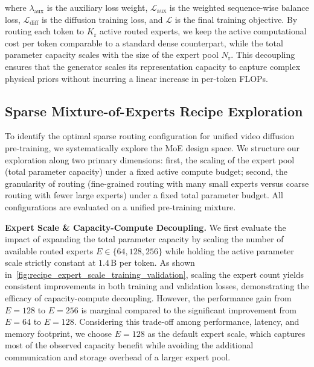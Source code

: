 where $\lambda_{\mathrm{aux}}$ is the auxiliary loss weight, $\mathcal{L}_{\mathrm{aux}}$ is the weighted sequence-wise balance loss, $\mathcal{L}_{\mathrm{diff}}$ is the diffusion training loss, and $\mathcal{L}$ is the final training objective. By routing each token to $K_{\mathrm{r}}$ active routed experts, we keep the active computational cost per token comparable to a standard dense counterpart, while the total parameter capacity scales with the size of the expert pool $N_{\mathrm{r}}$. This decoupling ensures that the generator scales its representation capacity to capture complex physical priors without incurring a linear increase in per-token FLOPs.

\subsection{Sparse Mixture-of-Experts Recipe Exploration} \label{subsec:moe_recipe}
To identify the optimal sparse routing configuration for unified video diffusion pre-training, we systematically explore the MoE design space. We structure our exploration along two primary dimensions: first, the scaling of the expert pool (total parameter capacity) under a fixed active compute budget; second, the granularity of routing (fine-grained routing with many small experts versus coarse routing with fewer large experts) under a fixed total parameter budget. All configurations are evaluated on a unified pre-training mixture.

\noindent\textbf{Expert Scale \& Capacity-Compute Decoupling.}
We first evaluate the impact of expanding the total parameter capacity by scaling the number of available routed experts $E \in \{64, 128, 256\}$ while holding the active parameter scale strictly constant at $1.4\,\mathrm{B}$ per token. As shown in~\cref{fig:recipe_expert_scale_training_validation}, scaling the expert count yields consistent improvements in both training and validation losses, demonstrating the efficacy of capacity-compute decoupling. However, the performance gain from $E=128$ to $E=256$ is marginal compared to the significant improvement from $E=64$ to $E=128$. Considering this trade-off among performance, latency, and memory footprint, we choose $E=128$ as the default expert scale, which captures most of the observed capacity benefit while avoiding the additional communication and storage overhead of a larger expert pool.

